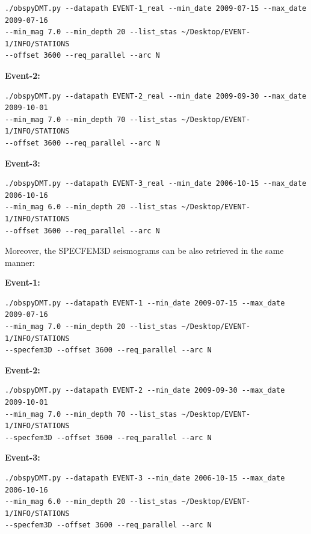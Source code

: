 \documentclass{article}
\begin{document}
\begin{verbatim}
./obspyDMT.py --datapath EVENT-1_real --min_date 2009-07-15 --max_date 2009-07-16 
--min_mag 7.0 --min_depth 20 --list_stas ~/Desktop/EVENT-1/INFO/STATIONS 
--offset 3600 --req_parallel --arc N
\end{verbatim}

\textbf{Event-2:}

\begin{verbatim}
./obspyDMT.py --datapath EVENT-2_real --min_date 2009-09-30 --max_date 2009-10-01 
--min_mag 7.0 --min_depth 70 --list_stas ~/Desktop/EVENT-1/INFO/STATIONS 
--offset 3600 --req_parallel --arc N
\end{verbatim}

\textbf{Event-3:}

\begin{verbatim}
./obspyDMT.py --datapath EVENT-3_real --min_date 2006-10-15 --max_date 2006-10-16 
--min_mag 6.0 --min_depth 20 --list_stas ~/Desktop/EVENT-1/INFO/STATIONS 
--offset 3600 --req_parallel --arc N
\end{verbatim}

Moreover, the SPECFEM3D seismograms can be also retrieved in the same manner:

\textbf{Event-1:}

\begin{verbatim}
./obspyDMT.py --datapath EVENT-1 --min_date 2009-07-15 --max_date 2009-07-16 
--min_mag 7.0 --min_depth 20 --list_stas ~/Desktop/EVENT-1/INFO/STATIONS 
--specfem3D --offset 3600 --req_parallel --arc N
\end{verbatim}

\textbf{Event-2:}

\begin{verbatim}
./obspyDMT.py --datapath EVENT-2 --min_date 2009-09-30 --max_date 2009-10-01 
--min_mag 7.0 --min_depth 70 --list_stas ~/Desktop/EVENT-1/INFO/STATIONS 
--specfem3D --offset 3600 --req_parallel --arc N
\end{verbatim}

\textbf{Event-3:}

\begin{verbatim}
./obspyDMT.py --datapath EVENT-3 --min_date 2006-10-15 --max_date 2006-10-16 
--min_mag 6.0 --min_depth 20 --list_stas ~/Desktop/EVENT-1/INFO/STATIONS 
--specfem3D --offset 3600 --req_parallel --arc N
\end{verbatim}
\end{document}
